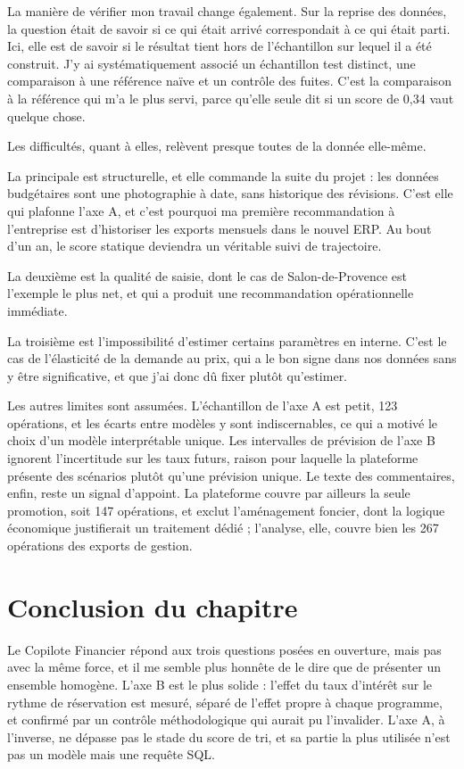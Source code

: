 La manière de vérifier mon travail change également. Sur la reprise des données, la question
était de savoir si ce qui était arrivé correspondait à ce qui était parti. Ici, elle est de
savoir si le résultat tient hors de l'échantillon sur lequel il a été construit. J'y ai
systématiquement associé un échantillon test distinct, une comparaison à une référence naïve et
un contrôle des fuites. C'est la comparaison à la référence qui m'a le plus servi, parce qu'elle
seule dit si un score de 0,34 vaut quelque chose.

Les difficultés, quant à elles, relèvent presque toutes de la donnée elle-même.

La principale est structurelle, et elle commande la suite du projet : les données budgétaires
sont une photographie à date, sans historique des révisions. C'est elle qui plafonne l'axe A, et
c'est pourquoi ma première recommandation à l'entreprise est d'historiser les exports mensuels
dans le nouvel ERP. Au bout d'un an, le score statique deviendra un véritable suivi de
trajectoire.

La deuxième est la qualité de saisie, dont le cas de Salon-de-Provence est l'exemple le plus net,
et qui a produit une recommandation opérationnelle immédiate.

La troisième est l'impossibilité d'estimer certains paramètres en interne. C'est le cas de
l'élasticité de la demande au prix, qui a le bon signe dans nos données sans y être
significative, et que j'ai donc dû fixer plutôt qu'estimer.

Les autres limites sont assumées. L'échantillon de l'axe A est petit, 123 opérations, et les
écarts entre modèles y sont indiscernables, ce qui a motivé le choix d'un modèle interprétable
unique. Les intervalles de prévision de l'axe B ignorent l'incertitude sur les taux futurs,
raison pour laquelle la plateforme présente des scénarios plutôt qu'une prévision unique. Le
texte des commentaires, enfin, reste un signal d'appoint. La plateforme couvre par ailleurs la
seule promotion, soit 147 opérations, et exclut l'aménagement foncier, dont la logique
économique justifierait un traitement dédié ; l'analyse, elle, couvre bien les 267 opérations
des exports de gestion.

\section{Conclusion du chapitre}

Le Copilote Financier répond aux trois questions posées en ouverture, mais pas avec la même
force, et il me semble plus honnête de le dire que de présenter un ensemble homogène. L'axe B
est le plus solide : l'effet du taux d'intérêt sur le rythme de réservation est mesuré, séparé
de l'effet propre à chaque programme, et confirmé par un contrôle méthodologique qui aurait pu
l'invalider. L'axe A, à l'inverse, ne dépasse pas le stade du score de tri, et sa partie la plus
utilisée n'est pas un modèle mais une requête SQL.

